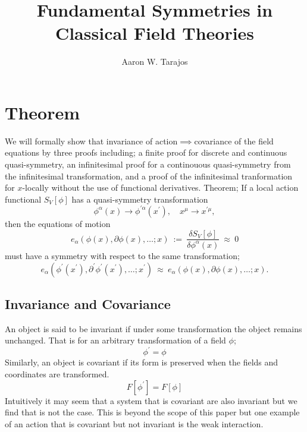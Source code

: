 \documentclass{article}
\title{Fundamental Symmetries in Classical Field Theories}
\author{Aaron W. Tarajos}
\begin{document}
\maketitle

\section{Theorem}
We will formally show that invariance of action$\implies$covariance of the field equations by three proofs including; a finite proof for discrete and continuous quasi-symmetry, an infinitesimal proof for a continouous quasi-symmetry from the infinitesimal transformation, and a proof of the infinitesimal tranformation for $x$-locally without the use of functional derivatives. Theorem;
If a local action functional $S_V\left[\phi\right]$ has a quasi-symmetry transformation
\begin{equation}
	\phi^\alpha (x) \to \phi^{\prime\alpha}(x^\prime), \quad x^\mu \to x^{\prime\mu},
\end{equation}
then the equations of motion
\begin{equation}
	e_{\alpha}(\phi(x),\partial\phi(x),\ldots ; x)~:=~\frac{\delta S_V[\phi]}{\delta \phi^{\alpha}(x)}~\approx~0
\end{equation}
must have a symmetry with respect to the same transformation;
\begin{equation}
	e_{\alpha}(\phi^{\prime}(x^{\prime}),\partial^{\prime}\phi^{\prime}(x^{\prime}),\ldots ; x^{\prime})~\approx~e_{\alpha}(\phi(x),\partial\phi(x),\ldots ; x).
\end{equation}

\subsection{Invariance and Covariance}
An object is said to be invariant if under some transformation the object remains unchanged. That is for an arbitrary transformation of a field $\phi$;
\[
	\phi^\prime  = \phi
\]
Similarly, an object is covariant if its form is preserved when the fields and coordinates are transformed.
\[
	F\left[\phi^\prime\right] = F\left[\phi\right]
\]
Intuitively it may seem that a system that is covariant are also invariant but we find that is not the case. This is beyond the scope of this paper but one example of an action that is covariant but not invariant is the weak interaction.
\end{document}

